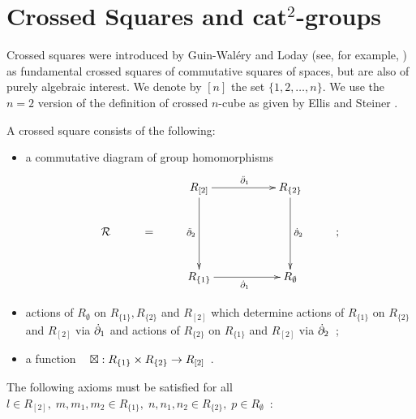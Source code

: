 
\section{Crossed Squares and cat$^2$-groups} \label{sect:xsq-cat2}

Crossed squares were introduced by Guin-Wal\'ery and Loday 
(see, for example, \cite{walery:loday,loday1,brow:lod})
as fundamental crossed squares of commutative squares of spaces,
but are also of purely algebraic interest.
We denote by $[n]$ the set $\{1,2,\ldots,n\}$.
We use the $n=2$ version of the definition of crossed $n$-cube
as given by Ellis and Steiner \cite{ell:st}.

\begin{defn} \label{def:xsq}  
A crossed square consists of the following:
\begin{itemize}
\item
a commutative diagram of group homomorphisms
\begin{equation} \label{eq:Rsquare}
\vcenter{\xymatrix{
       &   &  R_{[2]} \ar[rr]^{\ddbdyo} \ar[dd]_{\ddbdyt} 
              && R_{\{2\}} \ar[dd]^{\dbdyt} &   \\
\calR  & = &  &&                 & ; \\
       &   &  R_{\{1\}} \ar[rr]_{\dbdyo}  
              && R_{\emptyset} 
}} 
\end{equation}
\item
actions of $R_{\emptyset}$ on $R_{\{1\}}, R_{\{2\}}$ and $R_{[2]}$ 
which determine actions of 
$R_{\{1\}}$ on $R_{\{2\}}$ and $R_{[2]}$ via $\dot{\partial}_1$ 
and actions of 
$R_{\{2\}}$ on $R_{\{1\}}$ and $R_{[2]}$ via $\dot{\partial}_2$~;
\item
a function ~ $\boxtimes : R_{\{1\}} \times R_{\{2\}} \to R_{[2]}$~.
\end{itemize}
The following axioms must be satisfied for all 
$l \in R_{[2]},\; m,m_1,m_2 \in R_{\{1\}},\; 
n,n_1,n_2 \in R_{\{2\}},\; p \in R_{\emptyset}$~:
\end{defn}
